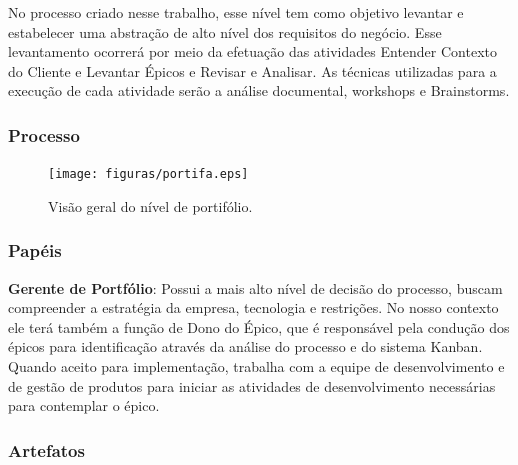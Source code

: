 No processo criado nesse trabalho, esse nível tem como objetivo levantar e estabelecer
uma abstração de alto nível dos requisitos do negócio. Esse levantamento ocorrerá
por meio da efetuação das atividades Entender Contexto do Cliente e Levantar Épicos
e Revisar e Analisar. As técnicas utilizadas para a execução de cada atividade serão
a análise documental, workshops e Brainstorms.

\subsubsection{Processo}

\begin{figure}[H]
    \centering
  \texttt{[image: figuras/portifa.eps]}
    \caption{Visão geral do nível de portifólio.}
    \label{fig:portifa}
\end{figure}

\subsubsection{Papéis}

\textbf{Gerente de Portfólio}: Possui a mais alto nível de decisão do processo, buscam compreender
a estratégia da empresa, tecnologia e restrições. No nosso contexto ele terá também
a função de Dono do Épico, que é responsável pela condução dos épicos para identificação
através da análise do processo e do sistema Kanban. Quando aceito para implementação,
trabalha com a equipe de desenvolvimento e de gestão de produtos para iniciar as atividades
de desenvolvimento necessárias para contemplar o épico.

\subsubsection{Artefatos}




